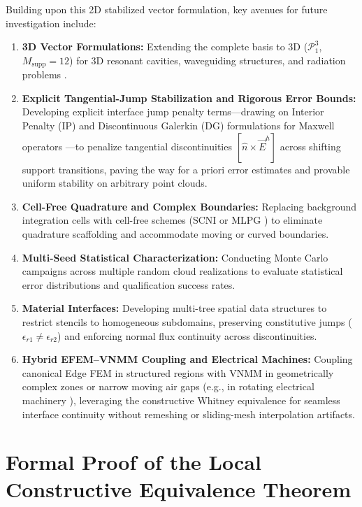\documentclass[preprint,12pt]{elsarticle}
\begin{document}
Building upon this 2D stabilized vector formulation, key avenues for future investigation include:
\begin{enumerate}
    \item \textbf{3D Vector Formulations:} Extending the complete basis to 3D ($\mathcal{P}_1^3$, $M_{\mathrm{supp}} = 12$) for 3D resonant cavities, waveguiding structures, and radiation problems \cite{goncalves2023vector}.
    \item \textbf{Explicit Tangential-Jump Stabilization and Rigorous Error Bounds:} Developing explicit interface jump penalty terms---drawing on Interior Penalty (IP) and Discontinuous Galerkin (DG) formulations for Maxwell operators \cite{houston2004mixed, hesthaven2004high, nguyen2011hybridizable}---to penalize tangential discontinuities $[\hat{n} \times \vec{E}^h]$ across shifting support transitions, paving the way for a priori error estimates and provable uniform stability on arbitrary point clouds.
    \item \textbf{Cell-Free Quadrature and Complex Boundaries:} Replacing background integration cells with cell-free schemes (SCNI \cite{chen2001stabilized} or MLPG \cite{atluri2002meshless}) to eliminate quadrature scaffolding and accommodate moving or curved boundaries.
    \item \textbf{Multi-Seed Statistical Characterization:} Conducting Monte Carlo campaigns across multiple random cloud realizations to evaluate statistical error distributions and qualification success rates.
    \item \textbf{Material Interfaces:} Developing multi-tree spatial data structures \cite{parreira2006efficient} to restrict stencils to homogeneous subdomains, preserving constitutive jumps ($\epsilon_{r1} \neq \epsilon_{r2}$) and enforcing normal flux continuity across discontinuities.
    \item \textbf{Hybrid EFEM--VNMM Coupling and Electrical Machines:} Coupling canonical Edge FEM in structured regions with VNMM in geometrically complex zones or narrow moving air gaps (e.g., in rotating electrical machinery \cite{coppoli2012induction}), leveraging the constructive Whitney equivalence for seamless interface continuity without remeshing or sliding-mesh interpolation artifacts.
\end{enumerate}


\appendix

\section{Formal Proof of the Local Constructive Equivalence Theorem}
\label{app:dual_whitney_proof}
\end{document}
